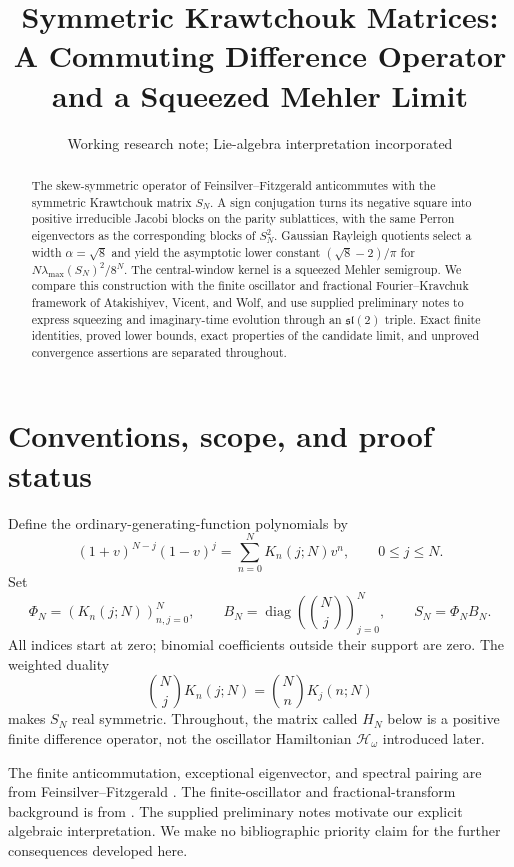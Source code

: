 \documentclass[11pt,reqno]{amsart}
\title{Symmetric Krawtchouk Matrices:\\A Commuting Difference Operator and a Squeezed Mehler Limit}
\date{Working research note; Lie-algebra interpretation incorporated}
\theoremstyle{definition}\newtheorem{definition}[theorem]{Definition}
\theoremstyle{remark}\newtheorem{remark}[theorem]{Remark}
\DeclareMathOperator{\diag}{diag}
\begin{document}
\begin{abstract}
The skew-symmetric operator of Feinsilver--Fitzgerald anticommutes with
the symmetric Krawtchouk matrix $S_N$. A sign conjugation turns its
negative square into positive irreducible Jacobi blocks on the parity
sublattices, with the same Perron eigenvectors as the corresponding
blocks of $S_N^2$. Gaussian Rayleigh quotients select a width
$\alpha=\sqrt8$ and yield the asymptotic lower constant
$(\sqrt8-2)/\pi$ for $N\lambda_{\max}(S_N)^2/8^N$.
The central-window kernel is a squeezed Mehler semigroup. We compare
this construction with the finite oscillator and fractional
Fourier--Kravchuk framework of Atakishiyev, Vicent, and Wolf, and use
supplied preliminary notes to express squeezing and imaginary-time
evolution through an $\mathfrak{sl}(2)$ triple. Exact finite identities,
proved lower bounds, exact properties of the candidate limit, and
unproved convergence assertions are separated throughout.
\end{abstract}
\maketitle
\tableofcontents

\section{Conventions, scope, and proof status}
Define the ordinary-generating-function polynomials by
\begin{equation}\label{eq:gen}
(1+v)^{N-j}(1-v)^j=\sum_{n=0}^N K_n(j;N)v^n,
\qquad 0\le j\le N.
\end{equation}
Set
\begin{equation}\label{eq:matrices}
\Phi_N=(K_n(j;N))_{n,j=0}^N,\qquad
B_N=\diag\left(\binom Nj\right)_{j=0}^N,\qquad
S_N=\Phi_NB_N.
\end{equation}
All indices start at zero; binomial coefficients outside their support
are zero. The weighted duality
\[
\binom NjK_n(j;N)=\binom NnK_j(n;N)
\]
makes $S_N$ real symmetric. Throughout, the matrix called $H_N$ below
is a positive finite difference operator, not the oscillator Hamiltonian
$\mathscr H_\omega$ introduced later.

The finite anticommutation, exceptional eigenvector, and spectral pairing
are from Feinsilver--Fitzgerald \cite{FF}. The finite-oscillator and
fractional-transform background is from \cite{AW,AVW}. The supplied
preliminary notes \cite{Notes} motivate our explicit algebraic
interpretation. We make no bibliographic priority claim for the further
consequences developed here.
\end{document}
